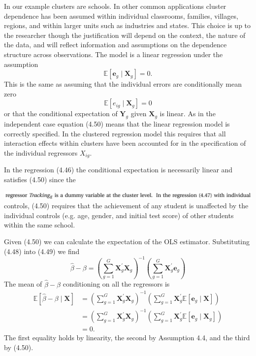 \documentclass[10pt]{article}
\begin{document}
In our example clusters are schools. In other common applications cluster dependence has been assumed within individual classrooms, families, villages, regions, and within larger units such as industries and states. This choice is up to the researcher though the justification will depend on the context, the nature of the data, and will reflect information and assumptions on the dependence structure across observations. The model is a linear regression under the assumption
$$
\mathbb{E}\left[\boldsymbol{e}_{g} \mid \boldsymbol{X}_{g}\right]=0 .
$$
This is the same as assuming that the individual errors are conditionally mean zero
$$
\mathbb{E}\left[e_{i g} \mid \boldsymbol{X}_{g}\right]=0
$$
or that the conditional expectation of $\boldsymbol{Y}_{g}$ given $\boldsymbol{X}_{g}$ is linear. As in the independent case equation (4.50) means that the linear regression model is correctly specified. In the clustered regression model this requires that all interaction effects within clusters have been accounted for in the specification of the individual regressors $X_{i g}$.

In the regression (4.46) the conditional expectation is necessarily linear and satisfies (4.50) since the

\includegraphics[max width=\textwidth]{2022_09_17_46fafb30295495354ae2g-29}\\
controls, (4.50) requires that the achievement of any student is unaffected by the individual controls (e.g. age, gender, and initial test score) of other students within the same school.

Given (4.50) we can calculate the expectation of the OLS estimator. Substituting (4.48) into (4.49) we find
$$
\widehat{\beta}-\beta=\left(\sum_{g=1}^{G} \boldsymbol{X}_{g}^{\prime} \boldsymbol{X}_{g}\right)^{-1}\left(\sum_{g=1}^{G} \boldsymbol{X}_{g}^{\prime} \boldsymbol{e}_{g}\right)
$$
The mean of $\widehat{\beta}-\beta$ conditioning on all the regressors is
$$
\begin{aligned}
\mathbb{E}[\widehat{\beta}-\beta \mid \boldsymbol{X}] &=\left(\sum_{g=1}^{G} \boldsymbol{X}_{g}^{\prime} \boldsymbol{X}_{g}\right)^{-1}\left(\sum_{g=1}^{G} \boldsymbol{X}_{g}^{\prime} \mathbb{E}\left[\boldsymbol{e}_{g} \mid \boldsymbol{X}\right]\right) \\
&=\left(\sum_{g=1}^{G} \boldsymbol{X}_{g}^{\prime} \boldsymbol{X}_{g}\right)^{-1}\left(\sum_{g=1}^{G} \boldsymbol{X}_{g}^{\prime} \mathbb{E}\left[\boldsymbol{e}_{g} \mid \boldsymbol{X}_{g}\right]\right) \\
&=0 .
\end{aligned}
$$
The first equality holds by linearity, the second by Assumption 4.4, and the third by (4.50).
\end{document}
